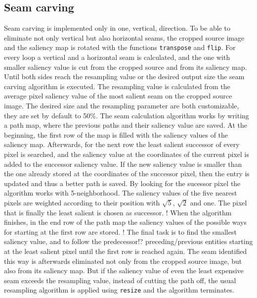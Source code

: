 \documentclass[draft,final]{vutinfth} %
\begin{document}
	\subsection{Seam carving}
	Seam carving is implemented only in one, vertical, direction. 
	To be able to eliminate not only vertical but also horizontal seams, the cropped source image and the saliency map is rotated with the functions \texttt{transpose} and \texttt{flip}.
	For every loop a vertical and a horizontal seam is calculated, and the one with smaller saliency value is cut from the cropped source and from its saliency map.
	Until both sides reach the resampling value or the desired output size the seam carving algorithm is executed.
	The resampling value is calculated from the average pixel saliency value of the most salient seam on the cropped source image.
	The desired size and the resampling parameter are both customizable, they are set by default to 50\%. 
	The seam calculation algorithm works by writing a path map, where the previous paths and their saliency value are saved.
	At the beginning, the first row of the map is filled with the saliency values of the saliency map.
	Afterwards, for the next row the least salient successor of every pixel is searched, and the saliency value at the coordinates of the current pixel is added to the successor saliency value.
	If the new saliency value is smaller than the one already stored at the coordinates of the successor pixel, then the entry is updated and thus a better path is saved.
	By looking for the sucessor pixel the algorithm works with 5-neighborhood. 
	The saliency values of the five nearest pixels are weighted according to their position with $\sqrt{5}$, $\sqrt{2}$ and one.
	The pixel that is finally the least salient is chosen as successor.
	! When the algorithm finishes, in the end row of the path map the saliency values of the possible ways for starting at the first row are stored.
	! The final task is to find the smallest saliency value, and to follow the predecessor!? preceding/previous entities starting at the least salient pixel until the first row is reached again.
	The seam identified this way is afterwards eliminated not only from the cropped source image, but also from its saliency map.
	But if the saliency value of even the least expensive seam exceeds the resampling value, instead of cutting the path off, the usual resampling algorithm is applied using \texttt{resize} and the algorithm terminates.  
	
\end{document}
